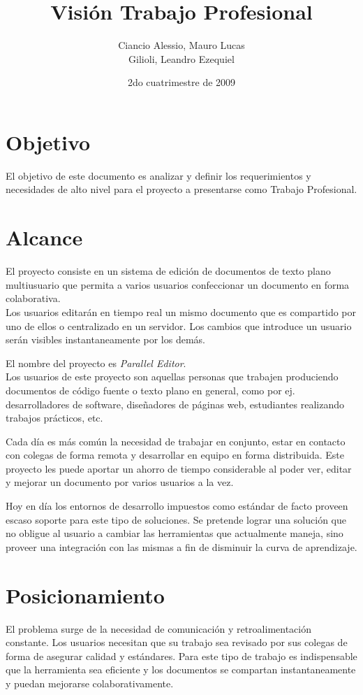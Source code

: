 \documentclass[a4paper,11pt]{article}
\title { Visi\'on Trabajo Profesional }
\date{2do cuatrimestre de 2009}
\author{Ciancio Alessio, Mauro Lucas \\ Gilioli, Leandro Ezequiel }
\begin{document}
	\maketitle

	\section{Objetivo}
		El objetivo de este documento es analizar y definir los requerimientos y
		necesidades de alto nivel para el proyecto a presentarse como Trabajo Profesional.

	\section{Alcance}
	    El proyecto consiste en un sistema de edici\'on de documentos de texto plano
	    multiusuario que permita a varios usuarios confeccionar un documento en forma
	    colaborativa. \\
	    Los usuarios editar\'an en tiempo real un mismo documento que es compartido por uno
	    de ellos o centralizado en un servidor. Los cambios que introduce un usuario 
	    ser\'an visibles instantaneamente por los dem\'as.	
	    
		El nombre del proyecto es \textit{Parallel Editor}. \\

		Los usuarios de este proyecto son aquellas personas que trabajen produciendo 
		documentos de c\'odigo fuente o texto plano en general, como por ej. desarrolladores
		de software, dise\~nadores de p\'aginas web, estudiantes realizando trabajos pr\'acticos,
		etc.

		Cada d\'ia es m\'as com\'un la necesidad de trabajar en conjunto, estar en contacto
		con colegas de forma remota y desarrollar en equipo en forma distribuida. Este proyecto
		les puede aportar un ahorro de tiempo considerable al poder ver, editar y mejorar un
		documento por varios usuarios a la vez.

	    Hoy en d\'ia los entornos de desarrollo impuestos como est\'andar de facto proveen escaso
	    soporte para este tipo de soluciones. Se pretende lograr una soluci\'on que no obligue al
	    usuario a cambiar las herramientas que actualmente maneja, sino proveer una integraci\'on
	    con las mismas a fin de disminuir la curva de aprendizaje.

	\section{Posicionamiento}
		El problema surge de la necesidad de comunicaci\'on y retroalimentaci\'on constante.
		Los usuarios necesitan que su trabajo sea revisado por sus colegas de forma de asegurar
		calidad y est\'andares. Para este tipo de trabajo es indispensable que la herramienta sea
		eficiente y los documentos se compartan instantaneamente y puedan mejorarse colaborativamente.
\end{document}

